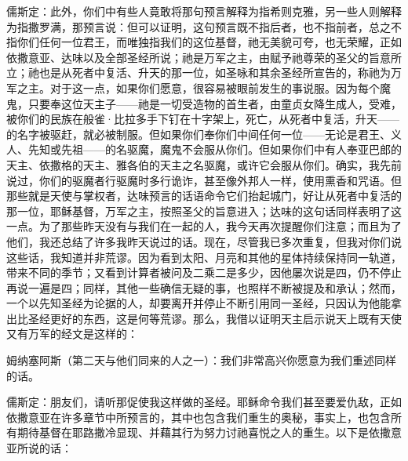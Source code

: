 儒斯定：此外，你们中有些人竟敢将那句预言解释为指希则克雅，另一些人则解释为指撒罗满，那预言说：但可以证明，这句预言既不指后者，也不指前者，总之不指你们任何一位君王，而唯独指我们的这位基督，祂无美貌可夸，也无荣耀，正如依撒意亚、达味以及全部圣经所说；祂是万军之主，由赋予祂尊荣的圣父的旨意所立；祂也是从死者中复活、升天的那一位，如圣咏和其余圣经所宣告的，称祂为万军之主。对于这一点，如果你们愿意，很容易被眼前发生的事说服。因为每个魔鬼，只要奉这位天主子——祂是一切受造物的首生者，由童贞女降生成人，受难，被你们的民族在般雀·比拉多手下钉在十字架上，死亡，从死者中复活，升天——的名字被驱赶，就必被制服。但如果你们奉你们中间任何一位——无论是君王、义人、先知或先祖——的名驱魔，魔鬼不会服从你们。但如果你们中有人奉亚巴郎的天主、依撒格的天主、雅各伯的天主之名驱魔，或许它会服从你们。确实，我先前说过，你们的驱魔者行驱魔时多行诡诈，甚至像外邦人一样，使用熏香和咒语。但那些就是天使与掌权者，达味预言的话语命令它们抬起城门，好让从死者中复活的那一位，耶稣基督，万军之主，按照圣父的旨意进入；达味的这句话同样表明了这一点。为了那些昨天没有与我们在一起的人，我今天再次提醒你们注意；而且为了他们，我还总结了许多我昨天说过的话。现在，尽管我已多次重复，但我对你们说这些话，我知道并非荒谬。因为看到太阳、月亮和其他的星体持续保持同一轨道，带来不同的季节；又看到计算者被问及二乘二是多少，因他屡次说是四，仍不停止再说一遍是四；同样，其他一些确信无疑的事，也照样不断被提及和承认；然而，一个以先知圣经为论据的人，却要离开并停止不断引用同一圣经，只因认为他能拿出比圣经更好的东西，这是何等荒谬。那么，我借以证明天主启示说天上既有天使又有万军的经文是这样的：\par

姆纳塞阿斯（第二天与他们同来的人之一）：我们非常高兴你愿意为我们重述同样的话。\par

儒斯定：朋友们，请听那促使我这样做的圣经。耶稣命令我们甚至要爱仇敌，正如依撒意亚在许多章节中所预言的，其中也包含我们重生的奥秘，事实上，也包含所有期待基督在耶路撒冷显现、并藉其行为努力讨祂喜悦之人的重生。以下是依撒意亚所说的话：\par

